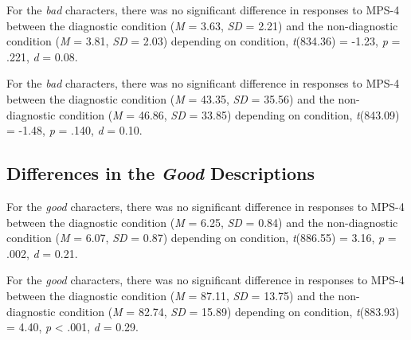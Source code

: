 \documentclass[
  english,
  man,floatsintext]{apa7}
\begin{document}
For the \emph{bad} characters, there was no significant difference in responses to MPS-4 between the diagnostic condition (\emph{M} = 3.63, \emph{SD} = 2.21) and the non-diagnostic condition (\emph{M} = 3.81, \emph{SD} = 2.03) depending on condition, \emph{t}(834.36) = -1.23, \emph{p} = .221, \emph{d} = 0.08.

For the \emph{bad} characters, there was no significant difference in responses to MPS-4 between the diagnostic condition (\emph{M} = 43.35, \emph{SD} = 35.56) and the non-diagnostic condition (\emph{M} = 46.86, \emph{SD} = 33.85) depending on condition, \emph{t}(843.09) = -1.48, \emph{p} = .140, \emph{d} = 0.10.

\hypertarget{differences-in-the-good-descriptions-1}{%
\subsection{\texorpdfstring{Differences in the \emph{Good} Descriptions}{Differences in the Good Descriptions}}\label{differences-in-the-good-descriptions-1}}

For the \emph{good} characters, there was no significant difference in responses to MPS-4 between the diagnostic condition (\emph{M} = 6.25, \emph{SD} = 0.84) and the non-diagnostic condition (\emph{M} = 6.07, \emph{SD} = 0.87) depending on condition, \emph{t}(886.55) = 3.16, \emph{p} = .002, \emph{d} = 0.21.

For the \emph{good} characters, there was no significant difference in responses to MPS-4 between the diagnostic condition (\emph{M} = 87.11, \emph{SD} = 13.75) and the non-diagnostic condition (\emph{M} = 82.74, \emph{SD} = 15.89) depending on condition, \emph{t}(883.93) = 4.40, \emph{p} \textless{} .001, \emph{d} = 0.29.
\end{document}
